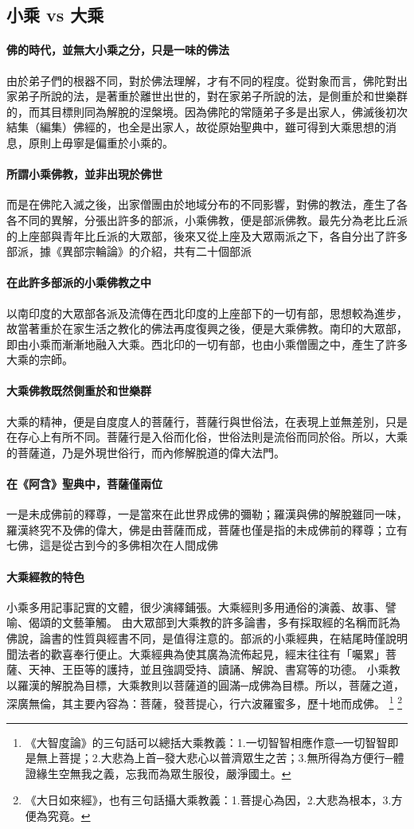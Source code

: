 \subsection{小乘 vs 大乘}
\paragraph{佛的時代，並無大小乘之分，只是一味的佛法} 由於弟子們的根器不同，對於佛法理解，才有不同的程度。從對象而言，佛陀對出家弟子所說的法，是著重於離世出世的，對在家弟子所說的法，是側重於和世樂群的，而其目標則同為解脫的涅槃境。因為佛陀的常隨弟子多是出家人，佛滅後初次結集（編集）佛經的，也全是出家人，故從原始聖典中，雖可得到大乘思想的消息，原則上毋寧是偏重於小乘的。
\paragraph{所謂小乘佛教，並非出現於佛世} 而是在佛陀入滅之後，出家僧團由於地域分布的不同影響，對佛的教法，產生了各各不同的異解，分張出許多的部派，小乘佛教，便是部派佛教。最先分為老比丘派的上座部與青年比丘派的大眾部，後來又從上座及大眾兩派之下，各自分出了許多部派，據《異部宗輪論》的介紹，共有二十個部派
\paragraph{在此許多部派的小乘佛教之中}以南印度的大眾部各派及流傳在西北印度的上座部下的一切有部，思想較為進步，故當著重於在家生活之教化的佛法再度復興之後，便是大乘佛教。南印的大眾部，即由小乘而漸漸地融入大乘。西北印的一切有部，也由小乘僧團之中，產生了許多大乘的宗師。
\paragraph{大乘佛教既然側重於和世樂群}大乘的精神，便是自度度人的菩薩行，菩薩行與世俗法，在表現上並無差別，只是在存心上有所不同。菩薩行是入俗而化俗，世俗法則是流俗而同於俗。所以，大乘的菩薩道，乃是外現世俗行，而內修解脫道的偉大法門。
\paragraph{在《阿含》聖典中，菩薩僅兩位}一是未成佛前的釋尊，一是當來在此世界成佛的彌勒；羅漢與佛的解脫雖同一味，羅漢終究不及佛的偉大，佛是由菩薩而成，菩薩也僅是指的未成佛前的釋尊；立有七佛，這是從古到今的多佛相次在人間成佛
\paragraph{大乘經教的特色}
小乘多用記事記實的文體，很少演繹鋪張。大乘經則多用通俗的演義、故事、譬喻、偈頌的文藝筆觸。
由大眾部到大乘教的許多論書，多有採取經的名稱而託為佛說，論書的性質與經書不同，是值得注意的。部派的小乘經典，在結尾時僅說明聞法者的歡喜奉行便止。大乘經典為使其廣為流佈起見，經末往往有「囑累」菩薩、天神、王臣等的護持，並且強調受持、讀誦、解說、書寫等的功德。
小乘教以羅漢的解脫為目標，大乘教則以菩薩道的圓滿─成佛為目標。所以，菩薩之道，深廣無倫，其主要內容為：菩薩，發菩提心，行六波羅蜜多，歷十地而成佛。
\footnote{《大智度論》的三句話可以總括大乘教義：1.一切智智相應作意─一切智智即是無上菩提；2.大悲為上首─發大悲心以普濟眾生之苦；3.無所得為方便行─體證緣生空無我之義，忘我而為眾生服役，嚴淨國土。}
\footnote{《大日如來經》，也有三句話攝大乘教義：1.菩提心為因，2.大悲為根本，3.方便為究竟。}

